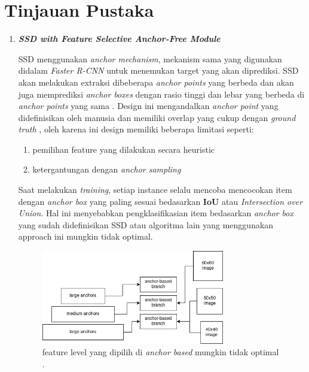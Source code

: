 \documentclass[a4paper]{article}
\begin{document}
\section*{Tinjauan Pustaka}
\begin{enumerate}

    \item \textbf{\textit{SSD with Feature Selective Anchor-Free Module}}

    SSD menggunakan \textit{anchor mechanism}, mekanism sama yang digunakan didalam \textit{Faster R-CNN} untuk menemukan target yang akan diprediksi. SSD akan melakukan extraksi dibeberapa \textit{anchor points} yang berbeda dan akan juga memprediksi \textit{anchor boxes} dengan rasio tinggi dan lebar yang berbeda di \textit{anchor points} yang sama \autocite{19532655}. Design ini mengandalkan \textit{anchor point} yang didefinisikan oleh manusia dan memiliki overlap yang cukup dengan \textit{ground truth} \autocite{FCOS-1}, oleh karena ini design memiliki beberapa limitasi seperti:
    \begin{enumerate}
        \item pemilihan feature yang dilakukan secara heuristic
        \item ketergantungan dengan \textit{anchor sampling}
    \end{enumerate}

    Saat melakukan \textit{training}, setiap instance selalu mencoba mencocokan item dengan \textit{anchor box} yang paling sesuai bedasarkan \textbf{IoU} atau \textit{Intersection over Union}. Hal ini menyebabkan pengklasifikasian item bedasarkan \textit{anchor box} yang sudah didefinisikan SSD atau algoritma lain yang menggunakan approach ini mungkin tidak optimal\autocite{Zhu_2019_CVPR}.


    \begin{figure}[h]
        \includegraphics[width=8cm]{general_architectur_anchor_based.png}
        \centering

        \caption{feature level yang dipilih di \textit{anchor based} mungkin tidak optimal \autocite{Zhu_2019_CVPR}.}
    \end{figure}


\end{enumerate}
\end{document}
